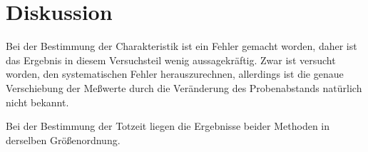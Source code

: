 
\section{Diskussion}

Bei der Bestimmung der Charakteristik ist ein Fehler gemacht worden,
daher ist das Ergebnis in diesem Versuchsteil wenig aussagekräftig. Zwar
ist versucht worden, den systematischen Fehler herauszurechnen,
allerdings ist die genaue Verschiebung der Meßwerte durch die
Veränderung des Probenabstands natürlich nicht bekannt.

Bei der Bestimmung der Totzeit liegen die Ergebnisse beider Methoden in
derselben Größenordnung.


